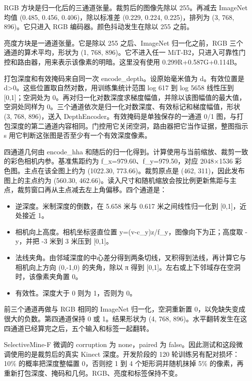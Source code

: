 \documentclass[UTF8,a4paper,11pt]{ctexart}
\begin{document}
RGB 方块是归一化后的三通道张量。裁剪后的图像先除以 255。再减去 ImageNet 均值 (0.485, 0.456, 0.406)，除以标准差 (0.229, 0.224, 0.225)，排列为 (3, 768, 896)。它只进入 RGB 编码器。颜色抖动发生在除以 255 之前。

亮度方块是一通道张量。它是除以 255 之后、ImageNet 归一化之前，RGB 三个通道的算术平均，形状为 (1, 768, 896)。它不进入任一 MiT-B2，只进入可靠性门控和路由器，用来表示该像素的明暗。这里没有使用 0.299R+0.587G+0.114B。

打包深度和有效掩码来自同一次 encode\_depth。设原始毫米值为 d。有效位置是 d>0。这些位置取自然对数，用训练集统计范围 log 617 到 log 5658 线性压到 [0,1]；空洞处为 0。再对归一化对数深度求梯度幅值，并除以该图幅值的最大值，空洞处同样为 0。三个通道依次是归一化对数深度、有效标记和梯度幅值，形状 (3, 768, 896)，送入 DepthEncoder。有效掩码是单独保存的一通道 0/1 图，与打包深度的第二通道内容相同。门控用它关闭空洞，路由器把它当作证据，整图指示 s 用它判断这张图是否至少有一个有效深度像素。

四通道几何由 encode\_hha 和随后的归一化得到。计算使用与当前缩放、裁剪一致的彩色相机内参。基准焦距约为 f\_x=979.60、f\_y=979.50，对应 2048×1536 彩色图。主点在该全图上约为 (1022.30, 773.66)。裁剪原点是 (462, 311)，因此发布图上的主点约为 (560.30, 462.66)。读入尺寸和随机缩放会按比例更新焦距与主点，裁剪窗口再从主点减去左上角偏移。四个通道是：

\begin{itemize}
\item 逆深度。米制深度的倒数，在 5.658 米与 0.617 米之间线性归一化到 [0,1]，近处接近 1。
\item 相机向上高度。相机坐标竖直位置 y=(v-c\_y)z/f\_y，图像向下为正；高度取 -y，并把 -3 米到 3 米压到 [0,1]。
\item 法线夹角。由邻域深度的中心差分得到两条切线，叉积得到法线，再计算它与相机向上方向 (0,-1,0) 的夹角，除以 π 得到 [0,1]。左右或上下邻域存在空洞时，该像素夹角置 0。
\item 有效性。深度大于 0 则为 1，否则为 0。
\end{itemize}
前三个通道再做与 RGB 相同的 ImageNet 归一化，空洞重新置 0，以免缺失变成很大的负数。第四通道保持 0 或 1。结果形状为 (4, 768, 896)。水平翻转发生在这四通道已经算完之后，五个输入和标签一起翻转。

SelectiveMine-F 微调的 corruption 为 none，paired 为 false。因此测试和这段微调使用的是裁剪后的真实 Kinect 深度。开发阶段的 120 轮训练另有配对损坏：10\% 的概率把深度整幅置 0，否则挖 1 到 4 个矩形洞并随机抹掉 5\% 的像素，再重新打包深度、掩码和几何。RGB、亮度和标签保持不变。
\end{document}
